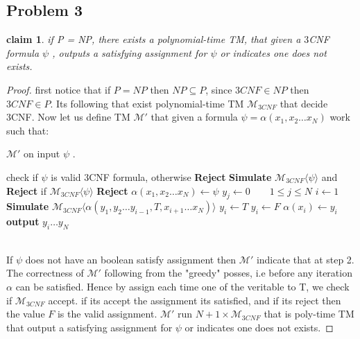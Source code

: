 \documentclass[12pt]{article}
\newtheorem*{claim*}{claim}
\begin{document}
\subsection*{Problem 3} \begin{claim*} if P = NP, there exists a polynomial-time TM, that given a
$3$CNF formula $\psi$ , outputs a satisfying assignment for $\psi$  or indicates one does
not exists.
\end{claim*}
\begin{proof}
first notice that if $P=NP$ then $NP\subseteq P$, since $3CNF\in NP$ then $3CNF\in P$. Its following that exist  polynomial-time TM $\mathcal{M}_{3CNF}$ that decide 3CNF.  Now let us define TM $\mathcal{M'}$ that given  a formula $\psi=\alpha(x_1,x_2\dots x_N)$ work such that:
\begin{algorithm}
\caption{ $\mathcal{M}'$ on input $\psi$ .}\label{alg:cap}
\begin{algorithmic} 
\State  check if   $\psi$ is valid 3CNF formula, otherwise \textbf{Reject}
\State \textbf{Simulate} $\mathcal{M}_{3CNF}\langle \psi\rangle$ and
\textbf{Reject} if $\mathcal{M}_{3CNF}\langle\psi\rangle$  \textbf{Reject}
\State $\alpha(x_1,x_2\dots x_N)\gets \psi$
\State $ y_j\gets 0 \quad  \quad 1\le j \le N$
\State $i\gets 1$
\State \textbf{Simulate} $\mathcal{M}_{3CNF}\langle\alpha(y_1,y_2\dots y_{i-1}, T, x_{i+1}\dots  x_N)\rangle$
\State $y_i \gets T$
\Else{}
\State $y_i\gets F$
\EndIf
\State $\alpha(x_i)\gets y_i$
\EndWhile
\State  \textbf{output} $y_i\dots y_N$
\end{algorithmic}
\end{algorithm}\\
If $\psi$ does not have an boolean satisfy assignment then $\mathcal{M}'$ indicate that at step 2. 
The correctness of $\mathcal{M}'$ following from the "greedy" posses, i.e before any iteration $\alpha$ can be satisfied. Hence by assign each time one of the veritable to T, we check if $\mathcal{M}_{3CNF}$ accept. if its accept the assignment its satisfied, and if its reject  then the value $F$    is the valid assignment. $\mathcal{M}'$ run $N+1 \times \mathcal{M}_{3CNF}$ that is poly-time TM that output a satisfying assignment for $\psi$  or indicates one does not exists.

\end{proof}
\end{document}
